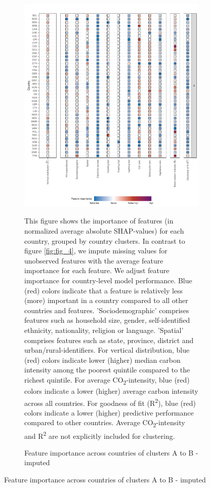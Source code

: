 \clearpage
\begin{figure}[ht!]\ContinuedFloat
    \centering
    \begin{subfigure}[b]{\textwidth}
    \centering
    \includegraphics{Figure 4/Figure_4_Corrected_Imputed_1.pdf}
    \caption{Feature importance across countries of clusters A to B - imputed}\label{fig:fig_4_2_imputed}\label{fig:fig_4_imputed}
    \begin{subcaption2}
    This figure shows the importance of features (in normalized average absolute SHAP-values) for each country, grouped by country clusters. In contrast to figure \ref{fig:fig_4}, we impute missing values for unobserved features with the average feature importance for each feature. We adjust feature importance for country-level model performance. Blue (red) colors indicate that a feature is relatively less (more) important in a country compared to all other countries and features. 'Sociodemographic' comprises features such as household size, gender, self-identified ethnicity, nationality, religion or language. 'Spatial' comprises features such as state, province, district and urban/rural-identifiers. For vertical distribution, blue (red) colors indicate lower (higher) median carbon intensity among the poorest quintile compared to the richest quintile. For average CO\textsubscript{2}-intensity, blue (red) colors indicate a lower (higher) average carbon intensity across all countries. For goodness of fit (R\textsuperscript{2}), blue (red) colors indicate a lower (higher) predictive performance compared to other countries. Average CO\textsubscript{2}-intensity and R\textsuperscript{2} are not explicitly included for clustering.

\end{subcaption2}
\end{subfigure}
\end{figure}
